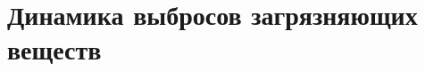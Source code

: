 







\section{Динамика выбросов загрязняющих веществ}
\begin{frame}{\insertsectionhead}
\end{frame}












